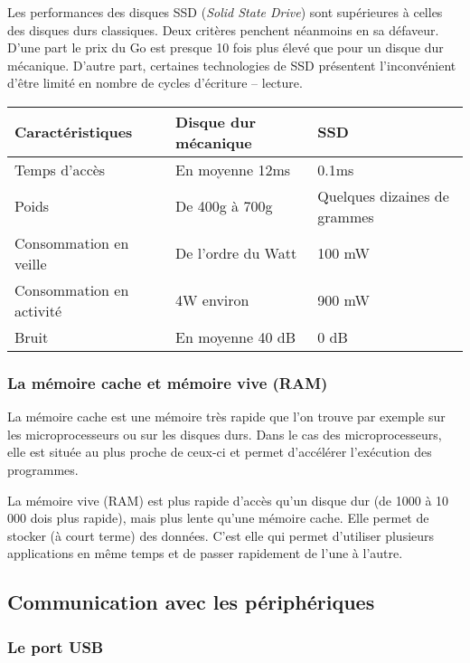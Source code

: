 Les performances des disques SSD (\textit{Solid State Drive}) sont supérieures à celles des disques durs classiques. Deux critères penchent néanmoins en sa défaveur. D'une part le prix du Go est presque 10 fois plus élevé 
que pour un disque dur mécanique. D'autre part, certaines technologies de SSD présentent l'inconvénient d'être limité en nombre de cycles d'écriture -- lecture.


\begin{center}
\begin{tabular}{|l|l|l|}
\hline
\textbf{Caractéristiques} & \textbf{Disque dur mécanique} & \textbf{SSD} \\ \hline
Temps d'accès & En moyenne 12ms & 0.1ms \\ \hline
Poids & De 400g à 700g & Quelques dizaines de grammes \\ \hline
Consommation en veille & De l'ordre du Watt & 100 mW \\ \hline
Consommation en activité & 4W environ & 900 mW \\ \hline
Bruit  & En moyenne 40 dB & 0 dB\\ \hline
\end{tabular}
\end{center}


\subsubsection{La mémoire cache et mémoire vive (RAM)}
La mémoire cache est une mémoire très rapide que l'on trouve par exemple sur les microprocesseurs ou sur les disques durs. Dans le cas des microprocesseurs, elle est située au plus proche de ceux-ci et permet d'accélérer l'exécution des programmes. 

La mémoire vive (RAM) est plus rapide d'accès qu'un disque dur (de 1000 à 10\, 000 dois plus rapide), mais plus lente qu'une mémoire cache.  Elle permet de stocker (à court terme) des données. C'est elle qui permet d'utiliser plusieurs applications en même temps et de passer rapidement de l'une à l'autre. 



\subsection{Communication avec les périphériques}
\subsubsection{Le port USB \cite{usb}}

